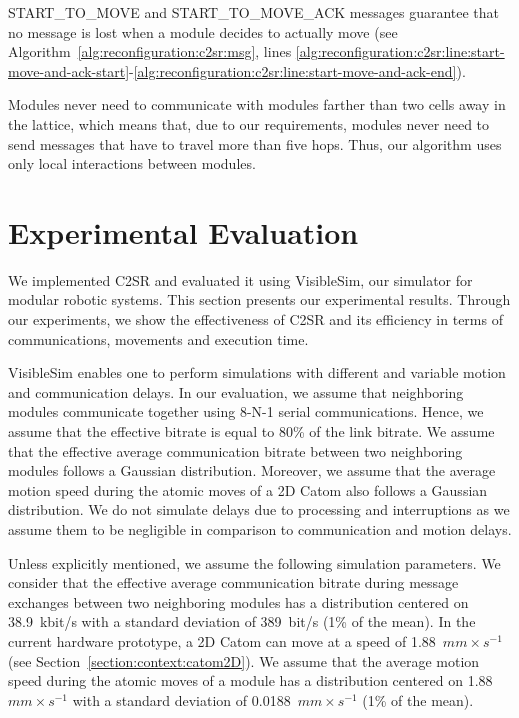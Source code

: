 START\_TO\_MOVE and START\_TO\_MOVE\_ACK messages guarantee that no message is lost when a module decides to actually move (see Algorithm~\ref{alg:reconfiguration:c2sr:msg}, lines 
\ref{alg:reconfiguration:c2sr:line:start-move-and-ack-start}-\ref{alg:reconfiguration:c2sr:line:start-move-and-ack-end}).

Modules never need to communicate with modules farther than two cells away in the lattice, which means that, due to our requirements, modules never need to send messages that have to travel more than five hops. Thus, our algorithm uses only local interactions between modules.

\section{Experimental Evaluation}
\label{section:reconfiguration:evaluation}

We implemented C2SR and evaluated it using VisibleSim, our simulator for modular robotic systems. This section presents our experimental results. Through our experiments, we show the effectiveness of C2SR and its efficiency in terms of communications, movements and execution time.

VisibleSim enables one to perform simulations with different and variable motion and communication delays. In our evaluation, we assume that neighboring modules communicate together using 8-N-1 serial communications. Hence, we assume that the effective bitrate is equal to 80\% of the link bitrate. We assume that the effective average communication bitrate between two neighboring modules follows a Gaussian distribution. Moreover, we assume that the average motion speed during the atomic moves of a 2D Catom also follows a Gaussian distribution. We do not simulate delays due to processing and interruptions as we assume them to be negligible in comparison to communication and motion delays.

Unless explicitly mentioned, we assume the following simulation parameters. We consider that the effective average communication bitrate during message exchanges between two neighboring modules has a distribution centered on 38.9~kbit/s with a standard deviation of 389~bit/s (1\% of the mean). In the current hardware prototype, a 2D Catom can move at a speed of 1.88~$mm \times s^{-1}$ (see Section~\ref{section:context:catom2D}). We assume that the average motion speed during the atomic moves of a module has a distribution centered on 1.88~$mm \times s^{-1}$ with a standard deviation of 0.0188~$mm \times s^{-1}$ (1\% of the mean).

